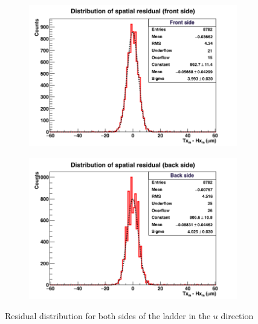     \begin{figure}[!tbh]
      \centering
      \begin{subfigure}[t]{0.45\textwidth}
        \centering
        \includegraphics[width = 1.2\textwidth]{Pictures/deformation/hxtxFront_226056.png}
      \end{subfigure}
      \quad
      \begin{subfigure}[t]{0.45\textwidth}
        \centering
        \includegraphics[width = 1.2\textwidth]{Pictures/deformation/hxtxBack_226056.png}
      \end{subfigure}
      \caption{Residual distribution for both sides of the ladder in the $u$ direction}
      \label{fig:residualFrontBackLadder}
    \end{figure}

